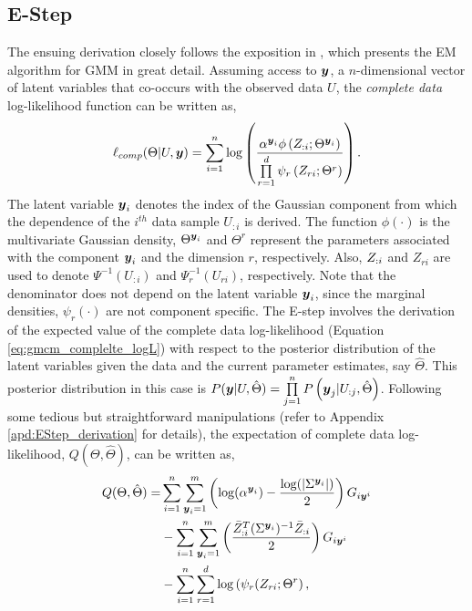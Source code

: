 \documentclass{article}
\theoremstyle{plain}
\theoremstyle{definition}
\theoremstyle{remark}
\begin{document}
\subsection{E-Step} \label{subsec:EStep}
The ensuing derivation closely follows the exposition in \citet{Bilmes98agentle}, which presents the EM algorithm for GMM in great detail. Assuming access to $\boldsymbol{y}$, a $n$-dimensional vector of latent variables that co-occurs with the observed data $U$, the \emph{complete data} log-likelihood function can be written as,
\begin{equation}\label{eq:gmcm_complelte_logL}
\ell_{comp}(\Theta |U,\boldsymbol{y})= \sum\limits_{i=1}^{n} \log \left( \frac{\alpha^{\boldsymbol{y}_i}\phi \left(Z_{:i};\Theta^{\boldsymbol{y}_i} \right)}{\prod\limits_{r=1}^{d}\psi_{r}\left(Z_{r{i}};\Theta^r \right)} \right) .
\end{equation}
The latent variable $\boldsymbol{y}_i$ denotes the index of the Gaussian component from which the dependence of the $i^{th}$ data sample $U_{:i}$ is derived. The function $\phi(\cdot)$ is the multivariate Gaussian density,  $\Theta^{\boldsymbol{y}_i}$ and $\Theta^r$ represent the parameters associated with the component $\boldsymbol{y}_i$  and the dimension $r$, respectively. Also, $Z_{:i}$ and $Z_{ri}$ are used to denote $\Psi^{-1}\left(U_{:i}\right)$ and $ \Psi_r^{-1}(U_{ri})$, respectively. Note that the denominator does not depend on the latent variable $\boldsymbol{y}_i$, since the marginal densities, $\psi_r(\cdot)$ are not component specific. The E-step involves the derivation of the expected value of the complete data log-likelihood (Equation \ref{eq:gmcm_complelte_logL}) with respect to the posterior distribution of the latent variables given the data and the current parameter estimates, say $\hat{\Theta}$. This posterior distribution in this case is $P(\boldsymbol{y}|U,\hat{\Theta}) = \prod\limits_{j=1}^{n}P\left(\boldsymbol{y}_j|U_{:j},\hat{\Theta} \right)$. Following some tedious but straightforward manipulations (refer to Appendix \ref{apd:EStep_derivation} for details), the expectation of complete data log-likelihood, $Q(\Theta,\hat{\Theta})$, can be written as,
\begin{align}\label{eq:GEM_objective}
Q(\Theta,\hat{\Theta}) =&  \sum\limits_{i=1}^n \sum\limits_{\boldsymbol{y}_i=1}^m  \left( \log (\alpha^{\boldsymbol{y}_i}) - \frac{\log(|\Sigma^{\boldsymbol{y}_i}|)}{2}\right) G_{i\boldsymbol{y}^i}  \nonumber \\ 
& -\sum\limits_{i=1}^n \sum\limits_{\boldsymbol{y}_i=1}^m  \left( \frac{\bar{Z}_{:{i}}^T(\Sigma^{\boldsymbol{y}_i})^{-1}\bar{Z}_{:{i}}}{2} \right) G_{i\boldsymbol{y}^i}  \nonumber \\
& -\sum\limits_{i=1}^n \sum\limits_{r=1}^{d} \log \left(\psi_r(Z_{ri};\Theta^r \right) ,
\end{align}
\end{document}
